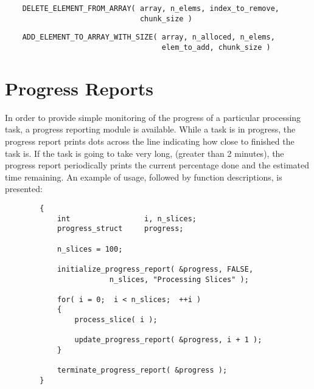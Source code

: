 {\bf\begin{verbatim}
    DELETE_ELEMENT_FROM_ARRAY( array, n_elems, index_to_remove,
                               chunk_size )
\end{verbatim}}


{\bf\begin{verbatim}
    ADD_ELEMENT_TO_ARRAY_WITH_SIZE( array, n_alloced, n_elems,
                                    elem_to_add, chunk_size )
\end{verbatim}}


\section{Progress Reports}

In order to provide simple monitoring of the progress of a particular
processing task, a progress reporting module is available.  While a
task is in progress, the progress report prints dots across the line
indicating how close to finished the task is.  If the task is going to
take very long, (greater than 2 minutes), the progress report
periodically prints the current percentage done and the estimated time
remaining.  An example of usage, followed by function descriptions, is
presented:

\begin{verbatim}
        {
            int                 i, n_slices;
            progress_struct     progress;

            n_slices = 100;

            initialize_progress_report( &progress, FALSE,
                        n_slices, "Processing Slices" );

            for( i = 0;  i < n_slices;  ++i )
            {
                process_slice( i );

                update_progress_report( &progress, i + 1 );
            }

            terminate_progress_report( &progress );
        }
\end{verbatim}


